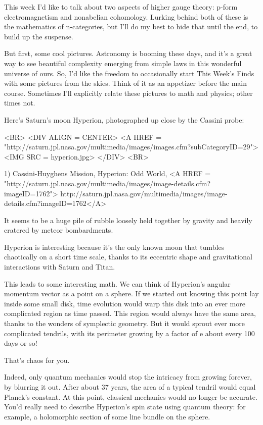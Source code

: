 


This week I'd like to talk about two aspects of higher gauge theory:
p-form electromagnetism and nonabelian cohomology.  Lurking behind both
of these is the mathematics of n-categories, but I'll do my best to hide
that until the end, to build up the suspense.  

But first, some cool pictures.  Astronomy is booming these days, and it's
a great way to see beautiful complexity emerging from simple laws in this 
wonderful universe of ours.  So, I'd like the freedom to occasionally start 
This Week's Finds with some pictures from the skies.  Think of it as an 
appetizer before the main course.  Sometimes I'll explicitly relate these 
pictures to math and physics; other times not.

Here's Saturn's moon Hyperion, photographed up close by the Cassini probe:

<BR>
<DIV ALIGN = CENTER>
<A HREF = "http://saturn.jpl.nasa.gov/multimedia/images/images.cfm?subCategoryID=29">
<IMG SRC = hyperion.jpg>
</DIV>
<BR>

1) Cassini-Huyghens Mission, Hyperion: Odd World, 
<A HREF = "http://saturn.jpl.nasa.gov/multimedia/images/image-details.cfm?imageID=1762">
http://saturn.jpl.nasa.gov/multimedia/images/image-details.cfm?imageID=1762</A>

It seems to be a huge pile of rubble loosely held together by gravity and
heavily cratered by meteor bombardments.  

Hyperion is interesting because it's the only known moon that tumbles 
chaotically on a short time scale, thanks to its eccentric shape and 
gravitational interactions with Saturn and Titan.  

This leads to some interesting math.  We can think of Hyperion's angular 
momentum vector as a point on a sphere.  If we started out knowing
this point lay inside some small disk, time evolution would warp this disk 
into an ever more complicated region as time passed.  This region would 
always have the same area, thanks to the wonders of symplectic geometry.   
But it would sprout ever more complicated tendrils, with its perimeter 
growing by a factor of e about every 100 days or so!  

That's chaos for you.

Indeed, only quantum mechanics would stop the intricacy from growing forever,
by blurring it out.  After about 37 years, the area of a typical tendril 
would equal Planck's constant.  At this point, classical mechanics would
no longer be accurate.  You'd really need to describe Hyperion's spin 
state using quantum theory: for example, a holomorphic section of some 
line bundle on the sphere.

